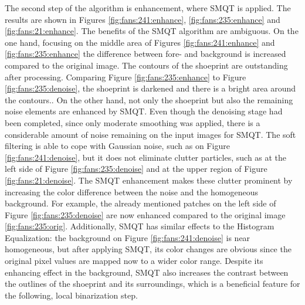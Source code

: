 \documentclass[draft,final]{vutinfth} %
\begin{document}
\par
The second step of the algorithm is enhancement, where SMQT is applied.
The results are shown in Figures \ref{fig:fans:241:enhance}, \ref{fig:fans:235:enhance} and \ref{fig:fans:21:enhance}.
The benefits of the SMQT algorithm are ambiguous.
On the one hand, focusing on the middle area of Figures  \ref{fig:fans:241:enhance} and \ref{fig:fans:235:enhance} the difference between fore- and background is increased compared to the original image.
The contours of the shoeprint are outstanding after processing.
Comparing Figure \ref{fig:fans:235:enhance} to Figure \ref{fig:fans:235:denoise}, the shoeprint is darkened and there is a bright area around the contours..
On the other hand, not only the shoeprint but also the remaining noise elements are enhanced by SMQT.
Even though the denoising stage had been completed, since only moderate smoothing was applied, there is a considerable amount of noise remaining on the input images for SMQT.
The soft filtering is able to cope with Gaussian noise, such as on Figure \ref{fig:fans:241:denoise}, but it does not eliminate clutter particles, such as at the left side of Figure \ref{fig:fans:235:denoise} and at the upper region of Figure \ref{fig:fans:21:denoise}.
The SMQT enhancement makes these clutter prominent by increasing the color difference between the noise and the homogeneous background.
For example, the already mentioned patches on the left side of Figure \ref{fig:fans:235:denoise} are now enhanced compared to the original image \ref{fig:fans:235:orig}.
Additionally, SMQT has similar effects to the Histogram Equalization: the background on Figure \ref{fig:fans:241:denoise} is near homogeneous, but after applying SMQT, its color changes are obvious since the original pixel values are mapped now to a wider color range.
Despite its enhancing effect in the background, SMQT also increases the contrast between the outlines of the shoeprint and its surroundings, which is a beneficial feature for the following, local binarization step.
\end{document}
